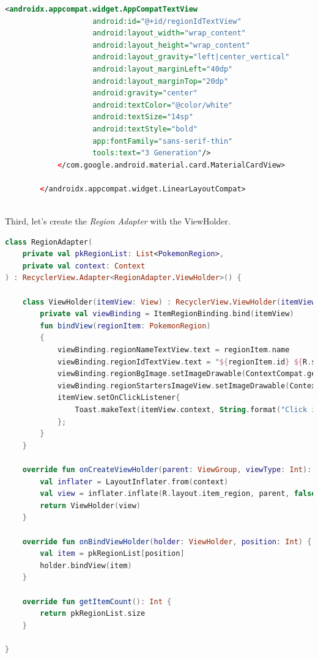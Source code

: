 \documentclass[a4paper, 12pt]{article}
\begin{document}
\begin{lstlisting}[caption={Region Item Layout.}, label={code:screen_item_region}, language=XML]
                <androidx.appcompat.widget.AppCompatTextView
                    android:id="@+id/regionIdTextView"
                    android:layout_width="wrap_content"
                    android:layout_height="wrap_content"
                    android:layout_gravity="left|center_vertical"
                    android:layout_marginLeft="40dp"
                    android:layout_marginTop="20dp"
                    android:gravity="center"
                    android:textColor="@color/white"
                    android:textSize="14sp"
                    android:textStyle="bold"
                    app:fontFamily="sans-serif-thin"
                    tools:text="3 Generation"/>
            </com.google.android.material.card.MaterialCardView>
    
        </androidx.appcompat.widget.LinearLayoutCompat>
    
\end{lstlisting}

Third, let's create the \textit{Region Adapter} with the ViewHolder.


\begin{lstlisting}[caption={Region Adapter Class.}, label={code:screen_region_adapter}, language=Kotlin]
    class RegionAdapter(
    private val pkRegionList: List<PokemonRegion>,
    private val context: Context
) : RecyclerView.Adapter<RegionAdapter.ViewHolder>() {

    class ViewHolder(itemView: View) : RecyclerView.ViewHolder(itemView) {
        private val viewBinding = ItemRegionBinding.bind(itemView)
        fun bindView(regionItem: PokemonRegion)
        {
            viewBinding.regionNameTextView.text = regionItem.name
            viewBinding.regionIdTextView.text = "${regionItem.id} ${R.string.pk_generations}".uppercase()
            viewBinding.regionBgImage.setImageDrawable(ContextCompat.getDrawable(itemView.context,regionItem.bg))
            viewBinding.regionStartersImageView.setImageDrawable(ContextCompat.getDrawable(itemView.context,regionItem.starters))
            itemView.setOnClickListener{
                Toast.makeText(itemView.context, String.format("Click in %s Region", regionItem.name), Toast.LENGTH_LONG).show()
            };
        }
    }

    override fun onCreateViewHolder(parent: ViewGroup, viewType: Int): ViewHolder {
        val inflater = LayoutInflater.from(context)
        val view = inflater.inflate(R.layout.item_region, parent, false)
        return ViewHolder(view)
    }

    override fun onBindViewHolder(holder: ViewHolder, position: Int) {
        val item = pkRegionList[position]
        holder.bindView(item)
    }

    override fun getItemCount(): Int {
        return pkRegionList.size
    }

}
\end{lstlisting}
\end{document}
